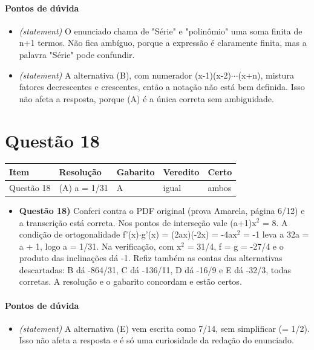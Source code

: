\documentclass{article}%
\begin{document}
\paragraph{Pontos de dúvida}%
\begin{itemize}%
\item%
\textit{(statement)} O enunciado chama de "Série" e "polinômio" uma soma finita de n+1 termos. Não fica ambíguo, porque a expressão é claramente finita, mas a palavra "Série" pode confundir.%
\item%
\textit{(statement)} A alternativa (B), com numerador (x{-}1)(x{-}2)$\cdot$$\cdot$$\cdot$(x+n), mistura fatores decrescentes e crescentes, então a notação não está bem definida. Isso não afeta a resposta, porque (A) é a única correta sem ambiguidade.%
\end{itemize}%
\section*{Questão 18}%
\begin{longtable}{@{}p{} p{} p{} p{} p{}@{}}\toprule Item & Resolução & Gabarito & Veredito & Certo \\ \midrule
Questão 18 & (A) a = 1/31 & A & igual & ambos \\
\bottomrule\end{longtable}%
\begin{itemize}%
\item%
\textbf{Questão 18)} Conferi contra o PDF original (prova Amarela, página 6/12) e a transcrição está correta. Nos pontos de interseção vale (a+1)x$^2$ = 8. A condição de ortogonalidade f'(x)$\cdot$g'(x) = (2ax)(-2x) = -4ax$^2$ = -1 leva a 32a = a + 1, logo a = 1/31. Na verificação, com x$^2$ = 31/4, f = g = -27/4 e o produto das inclinações dá -1. Refiz também as contas das alternativas descartadas: B dá -864/31, C dá -136/11, D dá -16/9 e E dá -32/3, todas corretas. A resolução e o gabarito concordam e estão certos.%
\end{itemize}%
\paragraph{Pontos de dúvida}%
\begin{itemize}%
\item%
\textit{(statement)} A alternativa (E) vem escrita como 7/14, sem simplificar (= 1/2). Isso não afeta a resposta e é só uma curiosidade da redação do enunciado.%
\end{itemize}%
\end{document}
